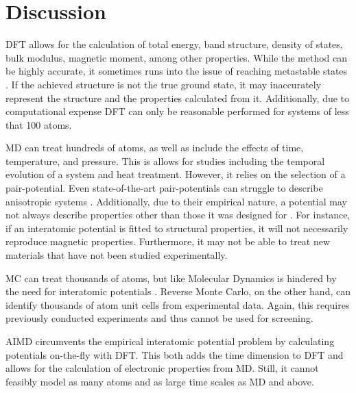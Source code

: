 \documentclass[3p,review,12pt]{elsarticle}
\begin{document}
\section{Discussion}
DFT allows for the calculation of total energy, band structure, density of states, bulk modulus, magnetic moment, among other properties. While the method can be highly accurate, it sometimes runs into the issue of reaching metastable states \cite{Dorado2013}. If the achieved structure is not the true ground state, it may inaccurately represent the structure and the properties calculated from it. Additionally, due to computational expense DFT can only be reasonable performed for systems of less that 100 atoms.
\par 
MD can treat hundreds of atoms, as well as include the effects of time, temperature, and pressure. This is allows for studies including the temporal evolution of a system and heat treatment. However, it relies on the selection of a pair-potential. Even state-of-the-art pair-potentials can struggle to describe anisotropic systems \cite{Hohl1991}. Additionally, due to their empirical nature, a potential may not always describe properties other than those it was designed for \cite{Cliffe2017, Car1988}. For instance, if an interatomic potential is fitted to structural properties, it will not necessarily reproduce magnetic properties. Furthermore, it may not be able to treat new materials that have not been studied experimentally.
\par 
MC can treat thousands of atoms, but like Molecular Dynamics is hindered by the need for interatomic potentials \cite{Car1988}. Reverse Monte Carlo, on the other hand, can identify thousands of atom unit cells from experimental data. Again, this requires previously conducted experiments and thus cannot be used for screening.
\par 
AIMD circumvents the empirical interatomic potential problem by calculating potentials on-the-fly with DFT.  This both adds the time dimension to DFT and allows for the calculation of electronic properties from MD. Still, it cannot feasibly model as many atoms and as large time scales as MD and above.
\par 
\end{document}
